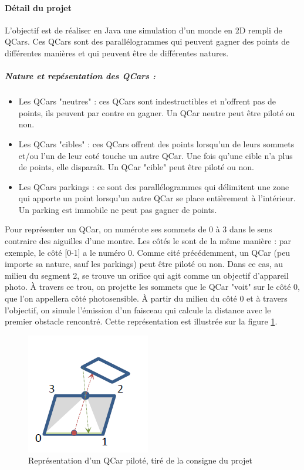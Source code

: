 \documentclass[a4paper, 12pt]{article}
\begin{document}
\paragraph{Détail du projet} L'objectif est de réaliser en Java une simulation d'un monde en 2D rempli de QCars. Ces QCars sont des parallélogrammes qui peuvent gagner des points de différentes manières et qui peuvent être de différentes natures.
\subparagraph{Nature et repésentation des QCars :}
\begin{itemize}
\item Les QCars "neutres" : ces QCars sont indestructibles et n'offrent pas de points, ils peuvent par contre en gagner. Un QCar neutre peut être piloté ou non.
\item Les QCars "cibles" : ces QCars offrent des points lorsqu'un de leurs sommets et/ou l'un de leur coté touche un autre QCar. Une fois qu'une cible n'a plus de points, elle disparaît. Un QCar "cible" peut être piloté ou non.
\item Les QCars parkings : ce sont des parallélogrammes qui délimitent une zone qui apporte un point lorsqu'un autre QCar se place entièrement à l'intérieur. Un parking est immobile ne peut pas gagner de points.\\
\end{itemize}
Pour représenter un QCar, on numérote ses sommets de 0 à 3 dans le sens contraire des aiguilles d'une montre. Les côtés le sont de la même manière : par exemple, le côté [0-1] a le numéro 0.
Comme cité précédemment, un QCar (peu importe sa nature, sauf les parkings) peut être piloté ou non. Dans ce cas, au milieu du segment 2, se trouve un orifice qui agit comme un objectif d'appareil photo. À travers ce trou, on projette les sommets que le QCar "voit" sur le côté 0, que l'on appellera côté photosensible. À partir du milieu du côté 0 et à travers l'objectif, on simule l'émission d'un faisceau qui calcule la distance avec le premier obstacle rencontré. Cette représentation est illustrée sur la figure \ref{fig:qcar}.
\begin{figure}[h!]
\centering
\includegraphics[width=0.35\linewidth]{includes/images/QCar}
\caption{Représentation d'un QCar piloté, tiré de la consigne du projet}
\label{fig:qcar}
\end{figure}
\end{document}
